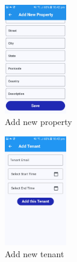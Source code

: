 \documentclass[sigconf]{acmart}
\begin{document}
\begin{figure}[h]
  \centering
  \includegraphics[width=0.24\textwidth]{addNewProperty.jpg}
  \caption{Add new property}
  \label{fig:addNewProperty}
\end{figure}

\begin{figure}[h]
  \centering
  \includegraphics[width=0.24\textwidth]{addTenant.jpg}
  \caption{Add new tenant}
  \label{fig:addTenant}
\end{figure}
\end{document}
